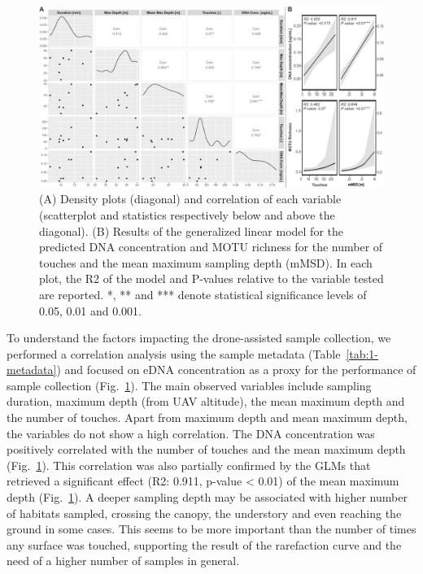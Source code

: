 \begin{figure}[tb]
    \centering
    \includegraphics[width=\linewidth]{chapters/papers/EP/figures/06_corr.pdf}
    \caption{(A) Density plots (diagonal) and correlation of each variable (scatterplot and statistics respectively below and above the diagonal). (B) Results of the generalized linear model for the predicted DNA concentration and \gls{MOTU} richness for the number of touches and the mean maximum sampling depth (mMSD). In each plot, the R2 of the model and P-values relative to the variable tested are reported. *, ** and *** denote statistical significance levels of 0.05, 0.01 and 0.001.}
    \label{fig:6-corr}
\end{figure}

To understand the factors impacting the drone-assisted sample collection, we performed a correlation analysis using the sample metadata (Table~\ref{tab:1-metadata}) and focused on \gls{eDNA} concentration as a proxy for the performance of sample collection (Fig.~\ref{fig:6-corr}). The main observed variables include sampling duration, maximum depth (from UAV altitude), the mean maximum depth and the number of touches. Apart from maximum depth and mean maximum depth, the variables do not show a high correlation. The DNA concentration was positively correlated with the number of touches and the mean maximum depth (Fig.~\ref{fig:6-corr}). This correlation was also partially confirmed by the \glspl{GLM} that retrieved a significant effect (R2: 0.911, p-value < 0.01) of the mean maximum depth (Fig.~\ref{fig:6-corr}). A deeper sampling depth may be associated with higher number of habitats sampled, crossing the canopy, the understory and even reaching the ground in some cases. This seems to be more important than the number of times any surface was touched, supporting the result of the rarefaction curve and the need of a higher number of samples in general.

